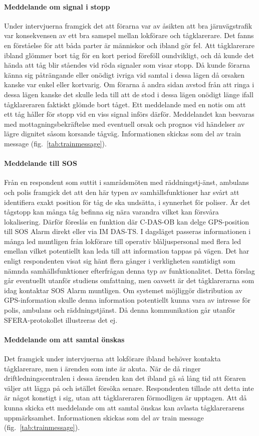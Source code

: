 \paragraph{Meddelande om signal i stopp}
Under intervjuerna framgick det att förarna var av åsikten att bra järnvägstrafik var konsekvensen av ett bra samspel mellan lokförare och tågklarerare.
Det fanns en förståelse för att båda parter är människor och ibland gör fel.
Att tågklarerare ibland glömmer bort tåg för en kort period föreföll oundvikligt, och då kunde det hända att tåg blir ståendes vid röda signaler som visar stopp.
Då kunde förarna känna sig påträngande eller onödigt ivriga vid samtal i dessa lägen då orsaken kanske var enkel eller kortvarig.
Om förarna å andra sidan avstod från att ringa i dessa lägen kanske det skulle leda till att de stod i dessa lägen onödigt länge ifall tågklareraren faktiskt glömde bort tåget.
Ett meddelande med en notis om att ett tåg håller för stopp vid en viss signal införs därför.
Meddelandet kan besvaras med mottagningsbekräftelse med eventuell orsak och prognos vid händelser av lägre dignitet såsom korsande tågväg.
Informationen skickas som del av train message (fig.~\ref{tab:trainmessage}).
\paragraph{Meddelande till SOS}
Från en respondent som suttit i samrådsmöten med räddningstj-änst, ambulans och polis framgick det att den här typen av samhällsfunktioner har svårt att identifiera exakt position för tåg de ska undsätta, i synnerhet för poliser.
Är det tågstopp kan många tåg befinna sig nära varandra vilket kan försvåra lokalisering.
Därför föreslås en funktion där C-DAS-OB kan delge GPS-position till SOS Alarm direkt eller via IM DAS-TS\@.
I dagsläget passeras informationen i många led muntligen från lokförare till operativ blåljuspersonal med flera led emellan vilket potentiellt kan leda till att information tappas på vägen.
Det har enligt respondenten visat sig hänt flera gånger i verkligheten samtidigt som nämnda samhällsfunktioner efterfrågan denna typ av funktionalitet.
Detta förslag går eventuellt utanför studiens omfattning, men oavsett är det tågklarerarna som idag kontaktar SOS Alarm muntligen.
Om systemet möjliggör distribution av GPS-information skulle denna information potentiellt kunna vara av intresse för polis, ambulans och räddningstjänst.
Då denna kommunikation går utanför SFERA-protokollet illustreras det ej.
\paragraph{Meddelande om att samtal önskas}
Det framgick under intervjuerna att lokförare ibland behöver kontakta tågklarerare, men i ärenden som inte är akuta.
När de då ringer driftledningscentralen i dessa ärenden kan det ibland gå så lång tid att föraren väljer att lägga på och istället försöka senare.
Respondenten tillade att detta inte är något konstigt i sig, utan att tågklareraren förmodligen är upptagen.
Att då kunna skicka ett meddelande om att samtal önskas kan avlasta tågklarerarens uppmärksamhet.
Informationen skickas som del av train message (fig.~\ref{tab:trainmessage}).
